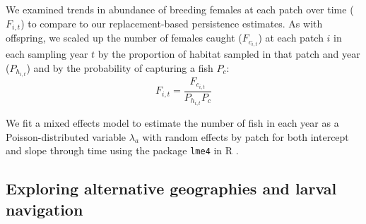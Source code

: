 \documentclass[12pt, oneside]{article}   	%
\begin{document}
We examined trends in abundance of breeding females at each patch over time ($F_{i,t}$) to compare to our replacement-based persistence estimates. As with offspring, we scaled up the number of females caught ($F_{c_{i,t}}$) at each patch $i$ in each sampling year $t$ by the proportion of habitat sampled in that patch and year ($P_{h_{i,t}}$) and by the probability of capturing a fish $P_c$:
\begin{equation}
F_{i,t} = \frac{F_{c_{i,t}}}{P_{h_{i,t}}P_c}
\end{equation}

We fit a mixed effects model to estimate the number of fish in each year as a Poisson-distributed variable $\lambda_a$ with random effects by patch for both intercept and slope through time using the package \texttt{lme4} in R \citep{lme42015package}.




\subsection*{Exploring alternative geographies and larval navigation}
\end{document}
